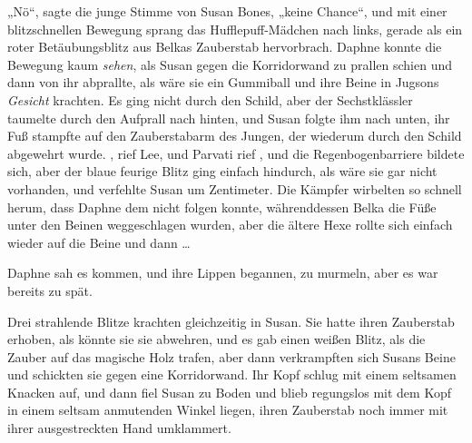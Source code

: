 „Nö“, sagte die junge Stimme von Susan Bones, „keine Chance“, und mit einer blitzschnellen Bewegung sprang das Hufflepuff-Mädchen nach links, gerade als ein roter Betäubungsblitz aus Belkas Zauberstab hervorbrach. Daphne konnte die Bewegung kaum \emph{sehen}, als Susan gegen die Korridorwand zu prallen schien und dann von ihr abprallte, als wäre sie ein Gummiball und ihre Beine in Jugsons \emph{Gesicht} krachten. Es ging nicht durch den Schild, aber der Sechstklässler taumelte durch den Aufprall nach hinten, und Susan folgte ihm nach unten, ihr Fuß stampfte auf den Zauberstabarm des Jungen, der wiederum durch den Schild abgewehrt wurde. , rief Lee, und Parvati rief , und die Regenbogenbarriere bildete sich, aber der blaue feurige Blitz ging einfach hindurch, als wäre sie gar nicht vorhanden, und verfehlte Susan um Zentimeter. Die Kämpfer wirbelten so schnell herum, dass Daphne dem nicht folgen konnte, währenddessen Belka die Füße unter den Beinen weggeschlagen wurden, aber die ältere Hexe rollte sich einfach wieder auf die Beine und dann …

Daphne sah es kommen, und ihre Lippen begannen,  zu murmeln, aber es war bereits zu spät.

Drei strahlende Blitze krachten gleichzeitig in Susan. Sie hatte ihren Zauberstab erhoben, als könnte sie sie abwehren, und es gab einen weißen Blitz, als die Zauber auf das magische Holz trafen, aber dann verkrampften sich Susans Beine und schickten sie gegen eine Korridorwand. Ihr Kopf schlug mit einem seltsamen Knacken auf, und dann fiel Susan zu Boden und blieb regungslos mit dem Kopf in einem seltsam anmutenden Winkel liegen, ihren Zauberstab noch immer mit ihrer ausgestreckten Hand umklammert.


